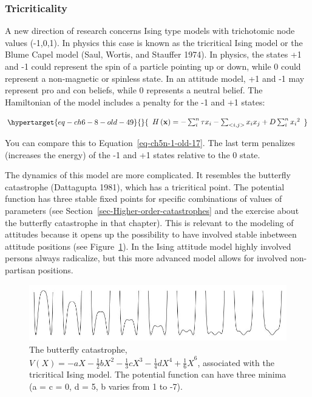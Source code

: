 \documentclass[
  a4paper,
  DIV=11,
  numbers=noendperiod,
  oneside]{scrreprt}
\begin{document}
\hypertarget{sec-Tricriticality}{%
\subsubsection{Tricriticality}\label{sec-Tricriticality}}

A new direction of research concerns Ising type models with trichotomic
node values (-1,0,1). In physics this case is known as the tricritical
Ising model or the Blume Capel model (Saul, Wortis, and Stauffer 1974).
In physics, the states +1 and -1 could represent the spin of a particle
pointing up or down, while 0 could represent a non-magnetic or spinless
state. In an attitude model, +1 and -1 may represent pro and con
beliefs, while 0 represents a neutral belief. The Hamiltonian of the
model includes a penalty for the -1 and +1 states:

\begin{equation}\protect\hypertarget{eq-ch6-8-old-49}{}{\begin{array}{r}
H\left( \mathbf{x} \right) = - \sum_{i}^{n}{\tau x_{i}} - \sum_{< i,j >}^{}{x_{i}x_{j}} + D\sum_{i}^{n}{x_{i}}^{2}
\end{array}}\label{eq-ch6-8-old-49}\end{equation}

You can compare this to Equation~\ref{eq-ch5n-1-old-17}. The last term
penalizes (increases the energy) of the -1 and +1 states relative to the
0 state.

The dynamics of this model are more complicated. It resembles the
butterfly catastrophe (Dattagupta 1981), which has a tricritical point.
The potential function has three stable fixed points for specific
combinations of values of parameters (see
Section~\ref{sec-Higher-order-catastrophes} and the exercise about the
butterfly catastrophe in that chapter). This is relevant to the modeling
of attitudes because it opens up the possibility to have involved stable
inbetween attitude positions (see Figure~\ref{fig-ch6-img15-old-84}). In
the Ising attitude model highly involved persons always radicalize, but
this more advanced model allows for involved non-partisan positions.

\begin{figure}

{\centering \includegraphics{media/ch6/image15.jpg}

}

\caption{\label{fig-ch6-img15-old-84}The butterfly catastrophe,
\(V(X) = {- aX - \frac{1}{2}bX^{2} - \frac{1}{3}cX^{3} - \frac{1}{4}dX^{4} + \frac{1}{6}X}^{6}\),
associated with the tricritical Ising model. The potential function can
have three minima (a = c = 0, d = 5, b varies from 1 to -7).}

\end{figure}
\end{document}
